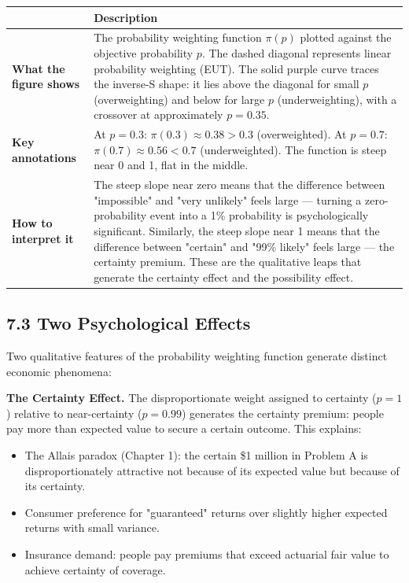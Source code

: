 \documentclass[12pt, letterpaper]{article}
\begin{document}
\begin{table}[H]
\centering
\small
\begin{tabularx}{\linewidth}{lY}
\toprule
 & Description \\
\midrule
\textbf{What the figure shows} & The probability weighting function $\pi(p)$ plotted against the objective probability $p$. The dashed diagonal represents linear probability weighting (EUT). The solid purple curve traces the inverse-S shape: it lies above the diagonal for small $p$ (overweighting) and below for large $p$ (underweighting), with a crossover at approximately $p = 0.35$. \\
\textbf{Key annotations} & At $p = 0.3$: $\pi(0.3) \approx 0.38 > 0.3$ (overweighted). At $p = 0.7$: $\pi(0.7) \approx 0.56 < 0.7$ (underweighted). The function is steep near 0 and 1, flat in the middle. \\
\textbf{How to interpret it} & The steep slope near zero means that the difference between "impossible" and "very unlikely" feels large --- turning a zero-probability event into a 1\% probability is psychologically significant. Similarly, the steep slope near 1 means that the difference between "certain" and "99\% likely" feels large --- the certainty premium. These are the qualitative leaps that generate the certainty effect and the possibility effect. \\
\bottomrule
\end{tabularx}
\end{table}



\subsection{7.3 Two Psychological Effects}


Two qualitative features of the probability weighting function generate distinct economic phenomena:

\textbf{The Certainty Effect.} The disproportionate weight assigned to certainty ($p = 1$) relative to near-certainty ($p = 0.99$) generates the certainty premium: people pay more than expected value to secure a certain outcome. This explains:
\begin{itemize}
\item The Allais paradox (Chapter 1): the certain \$1 million in Problem A is disproportionately attractive not because of its expected value but because of its certainty.
\item Consumer preference for "guaranteed" returns over slightly higher expected returns with small variance.
\item Insurance demand: people pay premiums that exceed actuarial fair value to achieve certainty of coverage.
\end{itemize}
\end{document}
